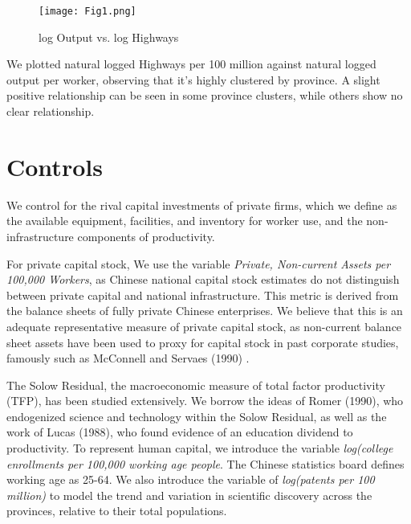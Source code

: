 \documentclass[11pt]{article}
\begin{document}
 \begin{figure}[H]
     \centering
     \texttt{[image: Fig1.png]}
 \caption{log Output vs. log Highways}
     \label{fig:enter-label}
 \end{figure}

We plotted natural logged Highways per 100 million against natural logged output per worker, observing that it’s highly clustered by province. A slight positive relationship can be seen in some province clusters, while others show no clear relationship. 

\section{Controls}

We control for the rival capital investments of private firms, which we define as the available equipment, facilities, and inventory for worker use, and the non-infrastructure components of productivity. 

For private capital stock, We use the variable \textit{Private, Non-current Assets per 100,000 Workers}, as Chinese national capital stock estimates do not distinguish between private capital and national infrastructure.  This metric is derived from the balance sheets of fully private Chinese enterprises. We believe that this is an adequate representative measure of private capital stock, as non-current balance sheet assets have been used to proxy for capital stock in past corporate studies, famously such as McConnell and Servaes (1990) . 

The Solow Residual, the macroeconomic measure of total factor productivity (TFP), has been studied extensively. We borrow the ideas of Romer (1990), who endogenized science and technology within the Solow Residual, as well as the work of Lucas (1988), who found evidence of an education dividend to productivity. To represent human capital, we introduce the variable \textit{log(college enrollments per 100,000 working age people}. The Chinese statistics board defines working age as 25-64. We also introduce the variable of \textit{log(patents per 100 million)} to model the trend and variation in scientific discovery across the provinces, relative to their total populations. 
\end{document}
